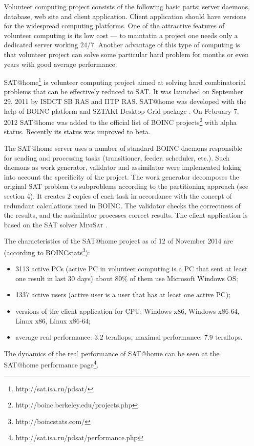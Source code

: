 \documentclass[runningheads,a4paper]{llncs}
\begin{document}
Volunteer computing project consists of the following basic parts: server daemons, database, web site and client application. Client application should have versions for the widespread computing platforms. One of the attractive features of volunteer computing is its low cost --- to maintatin a project one needs only a dedicated server working 24/7. Another advantage of this type of computing is that volunteer project can solve some particular hard problem for months or even years with good average performance.

SAT@home\footnote{http://sat.isa.ru/pdsat/} \cite{journals/csj/Posypkin12} is volunteer computing project aimed at solving hard combinatorial problems that can be effectively reduced to SAT. It was launched on September 29, 2011 by ISDCT SB RAS and IITP RAS. SAT@home was developed with the help of BOINC platform  \cite{DBLP:conf/grid/Anderson04} and SZTAKI Desktop Grid package \cite{sztaki6003}. On February 7, 2012 SAT@home was added to the official list of BOINC projects\footnote{http://boinc.berkeley.edu/projects.php} with alpha status. Recently its status was improved to beta.

The SAT@home server uses a number of standard BOINC daemons responsible for sending and processing tasks (transitioner, feeder, scheduler, etc.). Such daemons as work generator, validator and assimilator were implemented taking into account the specificity of the project. The work generator decomposes the original SAT problem to subproblems according to the partitioning approach (see section 4). It creates 2 copies of each task in accordance with the concept of redundant calculations used in BOINC. The validator checks the correctness of the results, and the assimilator processes correct results. The client application is based on the SAT solver \textsc{MiniSat} \cite{DBLP:conf/sat/EenS03}.

The characteristics of the SAT@home project as of 12 of November 2014 are (according to BOINCstats\footnote{http://boincstats.com/}):
\begin{itemize}
	\item 3113 active PCs (active PC in volunteer computing is a PC that sent at least one result in last 30 days) about 80\% of them use Microsoft Windows OS;
	\item 1337 active users (active user is a user that has at least one active PC);
	\item	versions of the client application for CPU: Windows x86, Windows x86-64, Linux x86, Linux x86-64;
	\item average real performance: 3.2 teraflops, maximal performance: 7.9 teraflops.
\end{itemize}
The dynamics of the real performance of SAT@home can be seen at the SAT@home performance page\footnote{http://sat.isa.ru/pdsat/performance.php}.
\end{document}
